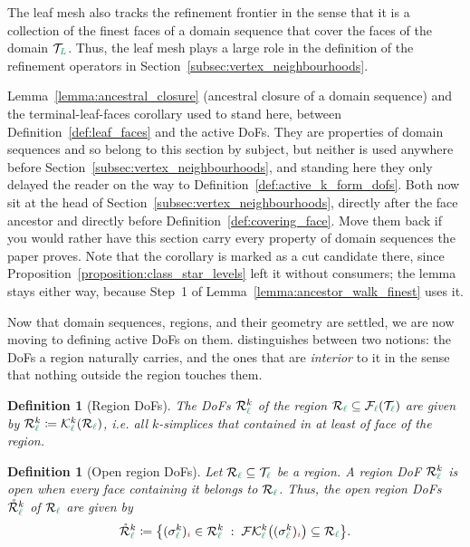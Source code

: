 \documentclass[a4paper, 12pt]{article}
\newcommand{\guidance}[1]{{\color{lime!70!black} #1}}
\newcommand{\green}{\color{ForestGreen}}
\newcommand{\brickred}{\color{BrickRed}}
\newcommand{\T}{\mathcal{T}}
\newcommand{\K}{\mathcal{K}}
\newcommand{\F}{\mathcal{F}}
\newcommand{\simplexname}{\sigma}
\newcommand{\simplex}[3]{\freeQ{\simplexname}{#1}{#2}{#3}}
\newcommand{\coarseIdxone}{{\brickred i}}
\renewcommand{\l}{{\green\ell}}
\renewcommand{\L}{{\green L}}
\newcommand{\R}{\mathcal{R}}
\newcommand{\freeQ}[4]{ ( {#1}^{#2}_{#3} )_{#4}}
\newtheorem{definition}[theorem]{Definition}
\theoremstyle{definition}
\theoremstyle{plain}
\numberwithin{equation}{section}
\newcommand{\patchDoFs}[2]{{#1}{}^{#2}}
\newcommand{\openPatchDoFs}[2]{\mathring{#1}{}^{#2}}
\begin{document}
The leaf mesh also tracks the refinement frontier in the sense that \guidance{it} is a collection of the finest faces of a domain sequence that cover the faces of the domain $\T_\L$. Thus, the leaf mesh plays a large role in the definition of the refinement operators in Section~\ref{subsec:vertex_neighbourhoods}.

\guidance{Lemma~\ref{lemma:ancestral_closure} (ancestral closure of a domain sequence) and the terminal-leaf-faces corollary used to stand here, between Definition~\ref{def:leaf_faces} and the active DoFs. They are properties of domain sequences and so belong to this section by subject, but neither is used anywhere before Section~\ref{subsec:vertex_neighbourhoods}, and standing here they only delayed the reader on the way to Definition~\ref{def:active_k_form_dofs}. Both now sit at the head of Section~\ref{subsec:vertex_neighbourhoods}, directly after the face ancestor and directly before Definition~\ref{def:covering_face}. Move them back if you would rather have this section carry every property of domain sequences the paper proves. Note that the corollary is marked as a cut candidate there, since Proposition~\ref{proposition:class_star_levels} left it without consumers; the lemma stays either way, because Step~1 of Lemma~\ref{lemma:ancestor_walk_finest} uses it.}

Now that domain sequences, regions, and their geometry are settled, we are now moving to defining active DoFs on them. \cite{companion_paper} distinguishes between two notions: the DoFs a region naturally carries, and the ones that are \emph{interior} to it in the sense that nothing outside the region touches them.

\begin{definition}[Region DoFs]
    \label{def:region_dofs}
    The DoFs $\patchDoFs{\R}{k}_\l$ of the region $\R_\l \subseteq \F_\l(\T_\l)$ are given by $\patchDoFs{\R}{k}_\l \coloneq \K^k_\l(\R_\l)$, i.e. all $k$-simplices that contained in at least of face of the region.
\end{definition}

\begin{definition}[Open region DoFs]
    \label{def:open_patch_dofs}
    Let $\R_\l \subseteq \T_\l$ be a region. A region DoF $\patchDoFs{\R}{k}_\l$ is \emph{open} when every face containing it belongs to $\R_\l$. Thus, the open region DoFs $\openPatchDoFs{\R}{k}_\l$ of $\R_\l$ are given by
    \begin{equation}
        \label{eq:open_dofs_membership}
        \openPatchDoFs{\R}{k}_\l \coloneq \big\{ \simplex{k}{\l}{\coarseIdxone} \in \patchDoFs{\R}{k}_\l
        \; : \; \F\K^k_\l\big(\simplex{k}{\l}{\coarseIdxone}\big) \subseteq \R_\l \big\}.
    \end{equation}
\end{definition}
\end{document}
